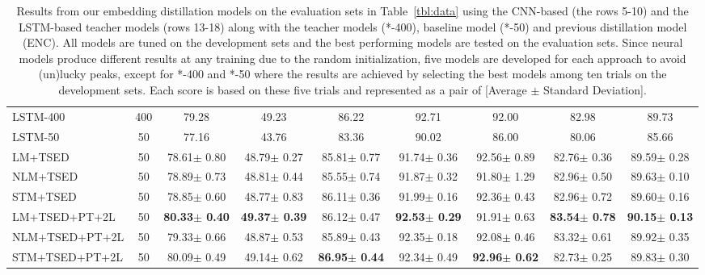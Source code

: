 \documentclass{article}
\begin{document}
\begin{table*}[htb!]
{\begin{tabular}{l:c||c|c|c|c|c|c|c}
			LSTM-400      &    400  &        79.28           &          49.23           &          86.22           &          92.71           &          92.00           &          82.98           &            89.73             \\
			LSTM-50       &     50  &       77.16           &          43.76           &          83.36           &          90.02           &          86.00           &          80.06           &            85.66             \\ \hline
			LM+TSED        &  50  &     78.61$\pm$ 0.80      &     48.79$\pm$ 0.27      &     85.81$\pm$ 0.77      &     91.74$\pm$ 0.36      & 92.56$\pm$ 0.89 &     82.76$\pm$ 0.36      &       89.59$\pm$ 0.28        \\
			NLM+TSED       &  50  & 78.89$\pm$ 0.73 & 48.81$\pm$ 0.44 &     85.55$\pm$ 0.74      &     91.87$\pm$ 0.32      &     91.80$\pm$ 1.29      & 82.96$\pm$ 0.50 &   89.63$\pm$ 0.10   \\
			STM+TSED       &  50  &     78.85$\pm$ 0.60      &     48.77$\pm$ 0.83      & 86.11$\pm$ 0.36 & 91.99$\pm$ 0.16 &     92.36$\pm$ 0.43      &     82.96$\pm$ 0.72      &       89.60$\pm$ 0.16        \\ \hline
			LM+TSED+PT+2L  &  50  & \textbf{80.33$\pm$ 0.40} & \textbf{49.37$\pm$ 0.39} &     86.12$\pm$ 0.47      & \textbf{92.53$\pm$ 0.29} &     91.91$\pm$ 0.63      & \textbf{83.54$\pm$ 0.78} &   \textbf{90.15$\pm$ 0.13}   \\
			NLM+TSED+PT+2L &    50  &   79.33$\pm$ 0.66      &     48.87$\pm$ 0.53      &     85.89$\pm$ 0.43      &     92.35$\pm$ 0.18      &     92.08$\pm$ 0.46      &     83.32$\pm$ 0.61      &       89.92$\pm$ 0.35        \\
			STM+TSED+PT+2L &     50  &  80.09$\pm$ 0.49      &     49.14$\pm$ 0.62      & \textbf{86.95$\pm$ 0.44} &     92.34$\pm$ 0.49      & \textbf{92.96$\pm$ 0.62} &     82.73$\pm$ 0.25      &       89.83$\pm$ 0.30
	\end{tabular}}
	\caption{Results from our embedding distillation models on the evaluation sets in Table~\ref{tbl:data} using the CNN-based (the rows 5-10) and the LSTM-based teacher models (rows 13-18) along with the teacher models (*-400), baseline model (*-50) and previous distillation model (ENC).
		All models are tuned on the development sets and the best performing models are tested on the evaluation sets.
		Since neural models produce different results at any training due to the random initialization, five models are developed for each approach to avoid (un)lucky peaks, except for *-400 and *-50 where the results are achieved by selecting the best models among ten trials on the development sets.
		Each score is based on these five trials and represented as a pair of [Average $\pm$ Standard Deviation].}
\label{tbl:comparison}
\end{table*}
\end{document}
